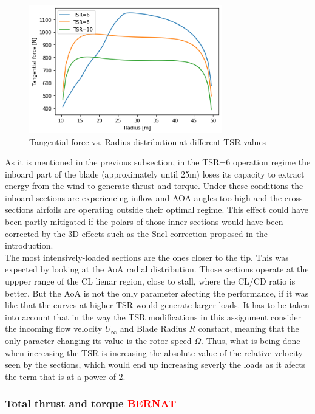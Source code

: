 \begin{figure}[htbp]
\includegraphics[width=0.75\textwidth]{./img/tang_plt_alligned.png}
\caption{Tangential force vs. Radius distribution at different TSR values}
\centering
\label{tang_alligned}
\end{figure}

As it is mentioned in the previous subsection, in the TSR=6 operation regime the inboard part of the blade (approximately until 25m) loses its capacity to extract energy from the wind to generate thrust and torque. Under these conditions the inboard sections are experiencing inflow and AOA angles too high and the cross-sections airfoils are operating outside their optimal regime. This effect could have been partly mitigated if the polars of those inner sections would have been corrected by the 3D effects such as the Snel correction proposed in the introduction. \\

The most intensively-loaded sections are the ones closer to the tip. This was expected by looking at the AoA radial distribution. Those sections operate at the uppper range of the CL lienar region, close to stall, where the CL/CD ratio is better. But the AoA is not the only parameter afecting the performance, if it was like that the curves at higher TSR would generate larger loads. It has to be taken into account that in the way the TSR modifications in this assignment consider the incoming flow velocity $U_{\infty}$ and Blade Radius $R$ constant, meaning that the only paraeter changing its value is the rotor speed $\Omega$. Thus, what is being done when increasing the TSR is increasing the absolute value of the relative velocity seen by the sections, which would end up increasing severly the loads as it afects the term that is at a power of 2. 

\subsubsection{\textbf{Total thrust and torque} \textcolor{red}{BERNAT}}

